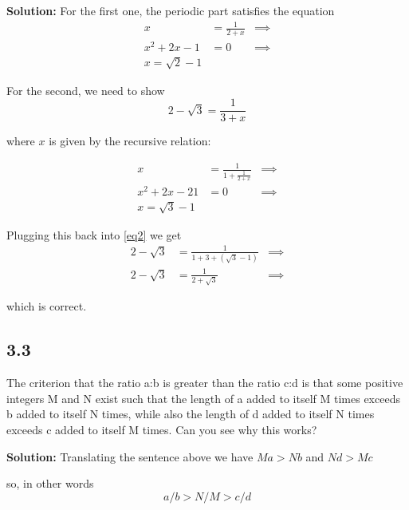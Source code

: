 \documentclass[]{article}
\begin{document}
\textbf{Solution:}
For the first one, the periodic part satisfies the equation
\begin{eqnarray}
x &= \frac{1}{2+x} & \implies \\
x^2+2x-1 &= 0 & \implies \\
x = \sqrt{2} - 1
\end{eqnarray}

For the second, we need to show 
\begin{equation}\label{eq2}
2-\sqrt{3} = \frac{1}{3+x}
\end{equation}

where $x$ is given by the recursive relation:

\begin{eqnarray}
x &= \frac{1}{1+\frac{1}{2+x}} & \implies \\
x^2+2x-21 &= 0 & \implies \\
x = \sqrt{3} - 1
\end{eqnarray}

Plugging this back into \ref{eq2} we get
\begin{eqnarray}
2 - \sqrt{3} &= \frac{1}{1+3+(\sqrt{3}-1)} & \implies \\
2 - \sqrt{3} &= \frac{1}{2+\sqrt{3}} & \implies 
\end{eqnarray}

which is correct.

\subsection*{3.3}
The criterion that the ratio a:b is greater than the ratio c:d is that some positive integers M and N exist
such that the length of a added to itself M times exceeds b added to itself N times,
while also the length of d added to itself N times exceeds c added to itself M times. Can you see why this works?

\textbf{Solution:}
Translating the sentence above we have
$Ma > Nb$ and $Nd > Mc$

so, in other words
$$
a/b > N/M >c/d
$$
\end{document}
